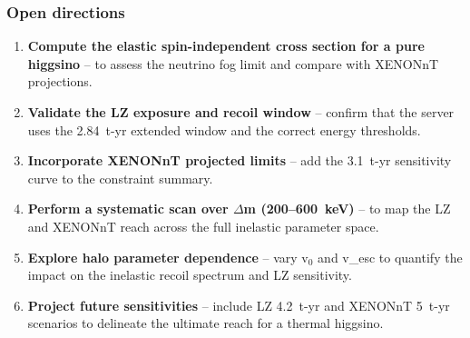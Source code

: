 \documentclass[11pt,a4paper]{article}
\begin{document}
\subsubsection*{Open directions}
\begin{enumerate}
  \item \textbf{Compute the elastic spin-independent cross section for a pure higgsino} -- to assess the neutrino fog limit and compare with XENONnT projections.
  \item \textbf{Validate the LZ exposure and recoil window} -- confirm that the server uses the 2.84~t-yr extended window and the correct energy thresholds.
  \item \textbf{Incorporate XENONnT projected limits} -- add the 3.1~t-yr sensitivity curve to the constraint summary.
  \item \textbf{Perform a systematic scan over $\Delta$m (200--600~keV)} -- to map the LZ and XENONnT reach across the full inelastic parameter space.
  \item \textbf{Explore halo parameter dependence} -- vary v$_0$ and v\_esc to quantify the impact on the inelastic recoil spectrum and LZ sensitivity.
  \item \textbf{Project future sensitivities} -- include LZ 4.2~t-yr and XENONnT 5~t-yr scenarios to delineate the ultimate reach for a thermal higgsino.
\end{enumerate}
\end{document}
